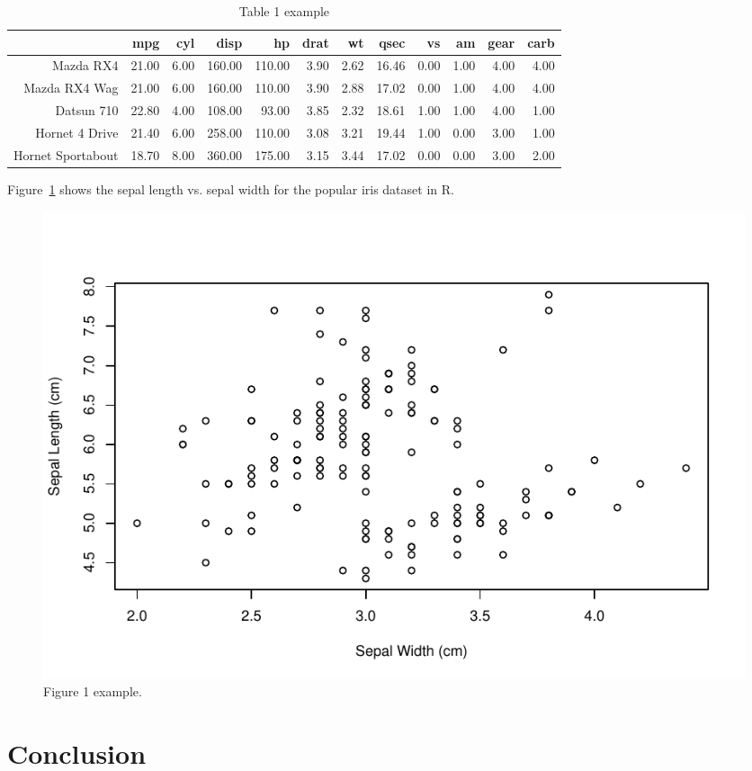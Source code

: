 \documentclass[12pt]{article}
\begin{document}
\begin{table}[tbp]
  \caption{Table 1 example}
  \label{tab:car}
\centering
\begin{tabular}{rrrrrrrrrrrr}
  \hline
 & mpg & cyl & disp & hp & drat & wt & qsec & vs & am & gear & carb \\ 
  \hline
Mazda RX4 & 21.00 & 6.00 & 160.00 & 110.00 & 3.90 & 2.62 & 16.46 & 0.00 & 1.00 & 4.00 & 4.00 \\ 
  Mazda RX4 Wag & 21.00 & 6.00 & 160.00 & 110.00 & 3.90 & 2.88 & 17.02 & 0.00 & 1.00 & 4.00 & 4.00 \\ 
  Datsun 710 & 22.80 & 4.00 & 108.00 & 93.00 & 3.85 & 2.32 & 18.61 & 1.00 & 1.00 & 4.00 & 1.00 \\ 
  Hornet 4 Drive & 21.40 & 6.00 & 258.00 & 110.00 & 3.08 & 3.21 & 19.44 & 1.00 & 0.00 & 3.00 & 1.00 \\ 
  Hornet Sportabout & 18.70 & 8.00 & 360.00 & 175.00 & 3.15 & 3.44 & 17.02 & 0.00 & 0.00 & 3.00 & 2.00 \\ 
   \hline
\end{tabular}
\end{table}

Figure~\ref{fig:iris} shows the sepal length vs. sepal width for the popular iris dataset in R.

\begin{figure}[tbp]
  \centering
  \includegraphics[width=\textwidth]{iris.pdf}
  \caption{Figure 1 example.}
  \label{fig:iris}
\end{figure}


\section{Conclusion}
\label{sec:con}
\end{document}
